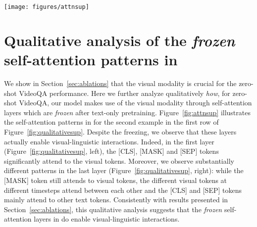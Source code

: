 \begin{figure*}[t]
\centering
\texttt{[image: figures/attnsup]}
\caption{\small \textbf{\model{} self-attention visualization for zero-shot VideoQA.} 
Visualization of the attention weights between the different visual tokens from the video prompt and the textual tokens from the text embedder, for the second example of the first row in Figure~\ref{fig:qualitativesup}. 
A column corresponds to the weights of the different visual and text tokens for the given token.
These attention weights are averaged across all 24 heads, and renormalized by the maximum weight for each token (\textit{i.e.}~each column) for the purpose of visualization.
Lighter colors correspond to higher attention
weights (see the colorbar on the right).
In the first layers (left), we observe that the multi-modal interactions mainly flow through the [CLS], [MASK] and [SEP] tokens, and that there is little interaction between the different visual tokens.
In the last layers (right), we observe that visual tokens attend to each other and the [MASK] token attends to the visual tokens, while the [CLS] and [SEP] tokens mainly attend to text tokens.
Note that the self-attention weights are \textit{frozen} after text-only pretraining.}
\label{fig:attnsup}
\end{figure*}

\section{Qualitative analysis of the \emph{frozen} self-attention patterns in \model{}}\label{sec:attention}
We show in Section~\ref{sec:ablations} that the visual modality is crucial for the zero-shot VideoQA performance.
Here we further analyze qualitatively \emph{how}, for zero-shot VideoQA, our model makes use of the visual modality through self-attention layers which are \textit{frozen} after text-only pretraining.
Figure~\ref{fig:attnsup} illustrates the self-attention patterns in \model{} for the second example in the first row of Figure~\ref{fig:qualitativesup}. 
Despite the freezing, we observe that these layers actually enable visual-linguistic interactions.
Indeed, in the first layer (Figure~\ref{fig:qualitativesup}, left), the [CLS], [MASK] and [SEP] tokens significantly attend to the visual tokens.
Moreover, we observe substantially different patterns in the last layer (Figure~\ref{fig:qualitativesup}, right): while the [MASK] token still attends to visual tokens, the different visual tokens at different timesteps attend between each other and the [CLS] and [SEP] tokens mainly attend to other text tokens.
Consistently with results
presented in Section~\ref{sec:ablations}, this qualitative analysis suggests that the \emph{frozen} self-attention layers in \model{} do enable visual-linguistic interactions.

